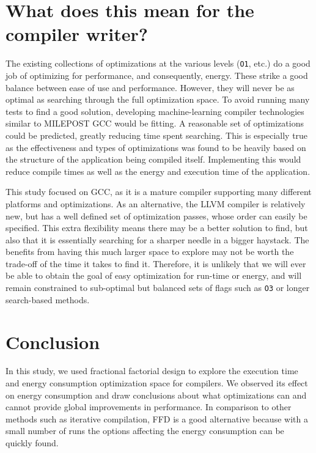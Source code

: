 \documentclass[twocolumn]{article}
\begin{document}
\section{What does this mean for the compiler writer?}

The existing collections of optimizations at the various levels (\texttt{O1}, etc.) do a good job of optimizing for performance, and consequently, energy. These strike a good balance between ease of use and performance. However, they will never be as optimal as searching through the full optimization space. To avoid running many tests to find a good solution, developing machine-learning compiler technologies similar to MILEPOST GCC would be fitting. A reasonable set of optimizations could be predicted, greatly reducing time spent searching. This is especially true as the effectiveness and types of optimizations was found to be heavily based on the structure of the application being compiled itself. Implementing this would reduce compile times as well as the energy and execution time of the application.

This study focused on GCC, as it is a mature compiler supporting many different platforms and optimizations. As an alternative, the LLVM compiler\cite{LLVM} is relatively new, but has a well defined set of optimization passes, whose order can easily be specified. This extra flexibility means there may be a better solution to find, but also that it is essentially searching for a sharper needle in a bigger haystack. The benefits from having this much larger space to explore may not be worth the trade-off of the time it takes to find it. Therefore, it is unlikely that we will ever be able to obtain the goal of easy optimization for run-time or energy, and will remain constrained to sub-optimal but balanced sets of flags such as \texttt{O3} or longer search-based methods.

\section{Conclusion}

In this study, we used fractional factorial design to explore the execution time and energy consumption optimization space for compilers. We observed its effect on energy consumption and draw conclusions about what optimizations can and cannot provide global improvements in performance. In comparison to other methods such as iterative compilation, FFD is a good alternative because with a small number of runs the options affecting the energy consumption can be quickly found.
\end{document}
